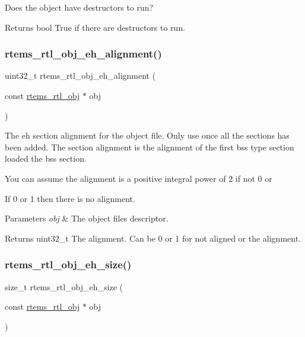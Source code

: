 Does the object have destructors to run?

\begin{DoxyReturn}{Returns}
bool True if there are destructors to run. 
\end{DoxyReturn}
\mbox{\label{rtl-obj_8c_aa093ee073ed78505eab0edc5eefee8b7}} 
\subsubsection{\texorpdfstring{rtems\_rtl\_obj\_eh\_alignment()}{rtems\_rtl\_obj\_eh\_alignment()}}
{\footnotesize\ttfamily uint32\+\_\+t rtems\+\_\+rtl\+\_\+obj\+\_\+eh\+\_\+alignment (\begin{DoxyParamCaption}\item[{const \mbox{\hyperlink{structrtems__rtl__obj}{rtems\+\_\+rtl\+\_\+obj}} $\ast$}]{obj }\end{DoxyParamCaption})}

The eh section alignment for the object file. Only use once all the sections has been added. The section alignment is the alignment of the first bss type section loaded the bss section.

You can assume the alignment is a positive integral power of 2 if not 0 or
\begin{DoxyEnumerate}
\item If 0 or 1 then there is no alignment.
\end{DoxyEnumerate}


\begin{DoxyParams}{Parameters}
{\em obj} & The object file\textquotesingle{}s descriptor. \\
\hline
\end{DoxyParams}
\begin{DoxyReturn}{Returns}
uint32\+\_\+t The alignment. Can be 0 or 1 for not aligned or the alignment. 
\end{DoxyReturn}
\mbox{\label{rtl-obj_8c_a4dbc1988e76114f9d94e56f01b034901}} 
\subsubsection{\texorpdfstring{rtems\_rtl\_obj\_eh\_size()}{rtems\_rtl\_obj\_eh\_size()}}
{\footnotesize\ttfamily size\+\_\+t rtems\+\_\+rtl\+\_\+obj\+\_\+eh\+\_\+size (\begin{DoxyParamCaption}\item[{const \mbox{\hyperlink{structrtems__rtl__obj}{rtems\+\_\+rtl\+\_\+obj}} $\ast$}]{obj }\end{DoxyParamCaption})}

